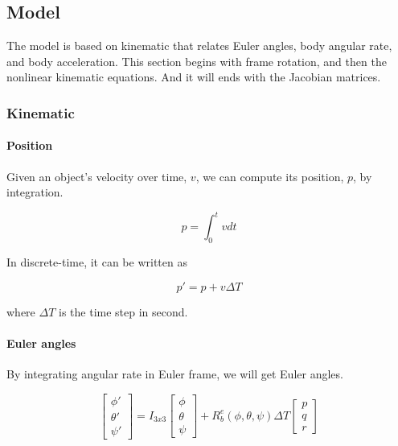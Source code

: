 \documentclass[]{article}
\begin{document}
\subsection{Model}
The model is based on kinematic that relates Euler angles, body angular rate, and body acceleration. This section begins with frame rotation, and then the nonlinear kinematic equations. And it will ends with the Jacobian matrices. 

\subsubsection{Kinematic}

\paragraph*{Position}
Given an object's velocity over time, $v$, we can compute its position, $p$, by integration.

\begin{equation}
	p = \int_0^t v dt
\end{equation}

In discrete-time, it can be written as

\begin{equation}
	p' = p + v \Delta T
\end{equation}

where $\Delta T$ is the time step in second.


\paragraph*{Euler angles}
By integrating angular rate in Euler frame, we will get Euler angles.

\begin{equation}
	\begin{bmatrix}
		\phi' \\
		\theta' \\
		\psi'
	\end{bmatrix} = I_{3x3} 
	\begin{bmatrix}
		\phi \\
		\theta \\
		\psi
	\end{bmatrix} + 
	R_b^e(\phi, \theta, \psi)
	\Delta T
	\begin{bmatrix}
		p \\
		q \\
		r
	\end{bmatrix}
\end{equation}
\end{document}
